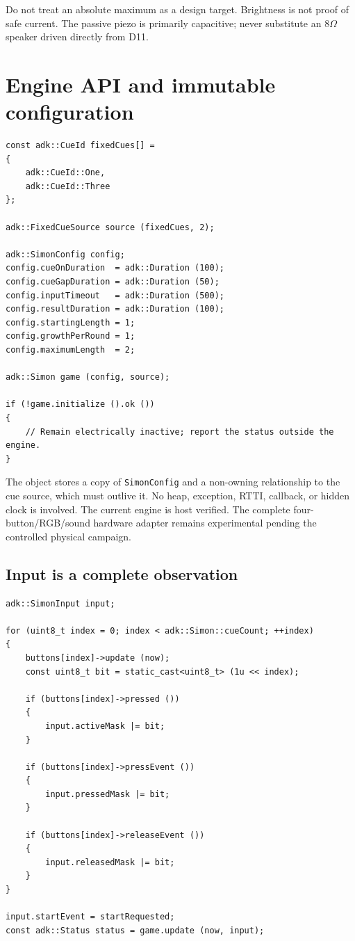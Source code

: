 \documentclass[11pt]{article}
\begin{document}
Do not treat an absolute maximum as a design target. Brightness is not proof of
safe current. The passive piezo is primarily capacitive; never substitute an
8\(\Omega\) speaker driven directly from D11.

\newpage
\section{Engine API and immutable configuration}

\begin{lstlisting}[style=adkcpp]
const adk::CueId fixedCues[] =
{
    adk::CueId::One,
    adk::CueId::Three
};

adk::FixedCueSource source (fixedCues, 2);

adk::SimonConfig config;
config.cueOnDuration  = adk::Duration (100);
config.cueGapDuration = adk::Duration (50);
config.inputTimeout   = adk::Duration (500);
config.resultDuration = adk::Duration (100);
config.startingLength = 1;
config.growthPerRound = 1;
config.maximumLength  = 2;

adk::Simon game (config, source);

if (!game.initialize ().ok ())
{
    // Remain electrically inactive; report the status outside the engine.
}
\end{lstlisting}

The object stores a copy of \texttt{SimonConfig} and a non-owning relationship
to the cue source, which must outlive it. No heap, exception, RTTI, callback, or
hidden clock is involved. The current engine is host verified. The complete
four-button/RGB/sound hardware adapter remains experimental pending the
controlled physical campaign.

\subsection{Input is a complete observation}

\begin{lstlisting}[style=adkcpp]
adk::SimonInput input;

for (uint8_t index = 0; index < adk::Simon::cueCount; ++index)
{
    buttons[index]->update (now);
    const uint8_t bit = static_cast<uint8_t> (1u << index);

    if (buttons[index]->pressed ())
    {
        input.activeMask |= bit;
    }

    if (buttons[index]->pressEvent ())
    {
        input.pressedMask |= bit;
    }

    if (buttons[index]->releaseEvent ())
    {
        input.releasedMask |= bit;
    }
}

input.startEvent = startRequested;
const adk::Status status = game.update (now, input);
\end{lstlisting}
\end{document}
